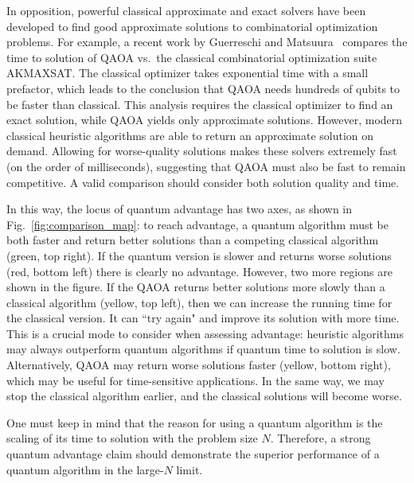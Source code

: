 \documentclass[prb,reprint,nofootinbib,longbibliography,superscriptaddress]{revtex4-1}
\begin{document}
In opposition, powerful classical approximate and exact solvers have been developed to find good approximate solutions to combinatorial optimization problems. For example, a recent work by Guerreschi and Matsuura~\cite{Guerreschi2019} compares the time to solution of QAOA vs.~the classical combinatorial optimization suite AKMAXSAT. The classical optimizer takes exponential time with a small prefactor, which leads to the conclusion that QAOA needs hundreds of qubits to be faster than classical. This analysis requires the classical optimizer to find an exact solution, while QAOA  yields only approximate solutions. However, modern classical heuristic algorithms are able to return an approximate solution on demand.
Allowing for worse-quality solutions makes these solvers extremely fast (on the order of milliseconds), suggesting that QAOA must also be fast to remain competitive.
A valid comparison should consider both solution quality and time.


In this way, the locus of quantum advantage has two axes, as shown in Fig.~\ref{fig:comparison_map}: to reach advantage, a quantum algorithm must be both faster and return better solutions than a competing classical algorithm (green, top right). If the quantum version is slower and returns worse solutions (red, bottom left) there is clearly no advantage. However,  two more regions are shown in the figure. If the QAOA returns better solutions more slowly than a classical algorithm (yellow, top left), then we can increase the running time for the classical version. It can ``try again" and improve its solution with more time. This is a crucial mode  to consider when assessing advantage: heuristic algorithms may always outperform quantum algorithms if quantum time to solution is slow.
Alternatively, QAOA may return worse solutions faster (yellow, bottom right), which may be useful for time-sensitive applications.
In the same way, we may stop the classical algorithm earlier, and the classical solutions will become worse.

One must keep in mind that the reason for using a quantum algorithm is the scaling of its time to solution with the problem size $N$. 
Therefore, a strong quantum advantage claim should demonstrate the superior performance of a quantum algorithm in the large-$N$ limit.
\end{document}
